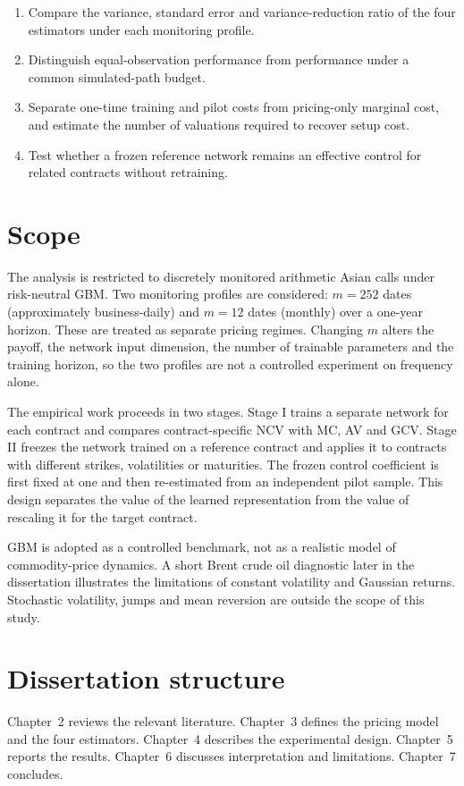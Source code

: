 \begin{enumerate}
    \item Compare the variance, standard error and variance-reduction ratio of the four estimators under each monitoring profile.
    \item Distinguish equal-observation performance from performance under a common simulated-path budget.
    \item Separate one-time training and pilot costs from pricing-only marginal cost, and estimate the number of valuations required to recover setup cost.
    \item Test whether a frozen reference network remains an effective control for related contracts without retraining.
\end{enumerate}

\section{Scope}

The analysis is restricted to discretely monitored arithmetic Asian calls under risk-neutral GBM. Two monitoring profiles are considered: $m=252$ dates (approximately business-daily) and $m=12$ dates (monthly) over a one-year horizon. These are treated as separate pricing regimes. Changing $m$ alters the payoff, the network input dimension, the number of trainable parameters and the training horizon, so the two profiles are not a controlled experiment on frequency alone.

The empirical work proceeds in two stages. Stage I trains a separate network for each contract and compares contract-specific NCV with MC, AV and GCV. Stage II freezes the network trained on a reference contract and applies it to contracts with different strikes, volatilities or maturities. The frozen control coefficient is first fixed at one and then re-estimated from an independent pilot sample. This design separates the value of the learned representation from the value of rescaling it for the target contract.

GBM is adopted as a controlled benchmark, not as a realistic model of commodity-price dynamics. A short Brent crude oil diagnostic later in the dissertation illustrates the limitations of constant volatility and Gaussian returns. Stochastic volatility, jumps and mean reversion are outside the scope of this study.

\section{Dissertation structure}

Chapter~2 reviews the relevant literature. Chapter~3 defines the pricing model and the four estimators. Chapter~4 describes the experimental design. Chapter~5 reports the results. Chapter~6 discusses interpretation and limitations. Chapter~7 concludes.
